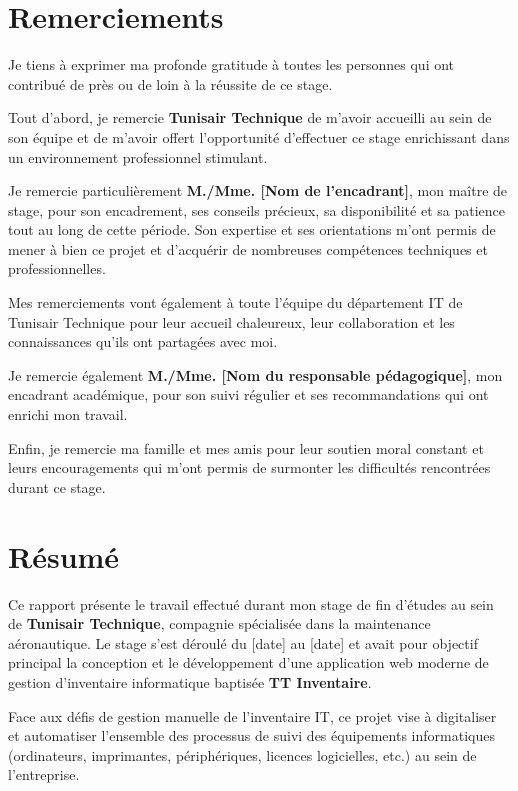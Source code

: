 \documentclass[12pt,a4paper]{report}
\begin{document}
\newpage
\chapter*{Remerciements}

Je tiens à exprimer ma profonde gratitude à toutes les personnes qui ont contribué de près ou de loin à la réussite de ce stage.

Tout d'abord, je remercie \textbf{Tunisair Technique} de m'avoir accueilli au sein de son équipe et de m'avoir offert l'opportunité d'effectuer ce stage enrichissant dans un environnement professionnel stimulant.

Je remercie particulièrement \textbf{M./Mme. [Nom de l'encadrant]}, mon maître de stage, pour son encadrement, ses conseils précieux, sa disponibilité et sa patience tout au long de cette période. Son expertise et ses orientations m'ont permis de mener à bien ce projet et d'acquérir de nombreuses compétences techniques et professionnelles.

Mes remerciements vont également à toute l'équipe du département IT de Tunisair Technique pour leur accueil chaleureux, leur collaboration et les connaissances qu'ils ont partagées avec moi.

Je remercie également \textbf{M./Mme. [Nom du responsable pédagogique]}, mon encadrant académique, pour son suivi régulier et ses recommandations qui ont enrichi mon travail.

Enfin, je remercie ma famille et mes amis pour leur soutien moral constant et leurs encouragements qui m'ont permis de surmonter les difficultés rencontrées durant ce stage.

\newpage
\chapter*{Résumé}

Ce rapport présente le travail effectué durant mon stage de fin d'études au sein de \textbf{Tunisair Technique}, compagnie spécialisée dans la maintenance aéronautique. Le stage s'est déroulé du [date] au [date] et avait pour objectif principal la conception et le développement d'une application web moderne de gestion d'inventaire informatique baptisée \textbf{TT Inventaire}.

Face aux défis de gestion manuelle de l'inventaire IT, ce projet vise à digitaliser et automatiser l'ensemble des processus de suivi des équipements informatiques (ordinateurs, imprimantes, périphériques, licences logicielles, etc.) au sein de l'entreprise.
\end{document}
